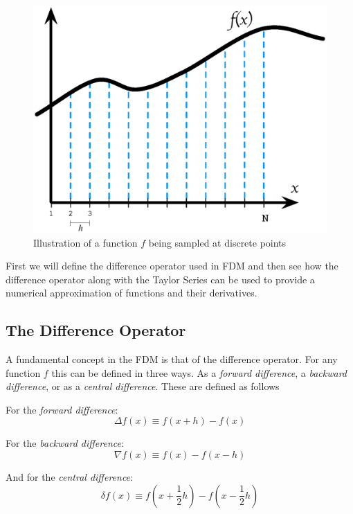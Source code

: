 \documentclass[authoryearcitations]{UoYCSproject}
\begin{document}
\begin{figure}[h]
  \centering
  \includegraphics[scale=0.5]{figures/sampledFunc3.eps}
    \caption{Illustration of a function $f$ being sampled at discrete points}
\end{figure}

First we will define the difference operator used in FDM and then see how the difference 
operator along with the Taylor Series can be used to provide a numerical approximation of 
functions and their derivatives. 

\subsection{The Difference Operator}
A fundamental concept in the FDM is that of the difference operator. For any function 
$f$ this can be defined in three ways. As a \emph{forward difference}, a \emph{backward difference},
or as a \emph{central difference}. These are defined as follows

For the \emph{forward difference}:
\begin{equation}
\label{eq:forwardDiff}
\Delta f(x) \equiv  f(x + h) - f(x)
\end{equation}

For the \emph{backward difference}:
\begin{equation}
\label{eq:backDiff}
\nabla f(x) \equiv  f(x) - f(x - h)
\end{equation}

And for the \emph{central difference}:
\begin{equation}
\label{eq:centDiff}
\delta f(x) \equiv  f(x + \frac{1}{2}h) - f(x - \frac{1}{2}h)
\end{equation}
\end{document}
